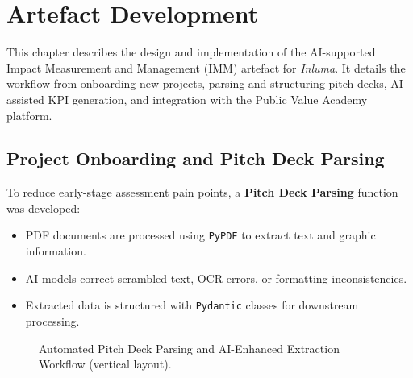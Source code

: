 \chapter{Artefact Development}\label{ch:artefact-development}

This chapter describes the design and implementation of the AI-supported Impact Measurement and Management (IMM) artefact for \textit{Inluma}.
It details the workflow from onboarding new projects, parsing and structuring pitch decks, AI-assisted KPI generation, and integration with the Public Value Academy platform.

\section{Project Onboarding and Pitch Deck Parsing}\label{sec:onboarding}

To reduce early-stage assessment pain points, a \textbf{Pitch Deck Parsing} function was developed:

\begin{itemize}
    \item PDF documents are processed using \texttt{PyPDF} to extract text and graphic information.
    \item AI models correct scrambled text, OCR errors, or formatting inconsistencies.
    \item Extracted data is structured with \texttt{Pydantic} classes for downstream processing.
\end{itemize}

\begin{figure}[H]
    \centering
    \caption{Automated Pitch Deck Parsing and AI-Enhanced Extraction Workflow (vertical layout).}
    \label{fig:pitchdeck-parsing}
\end{figure}

